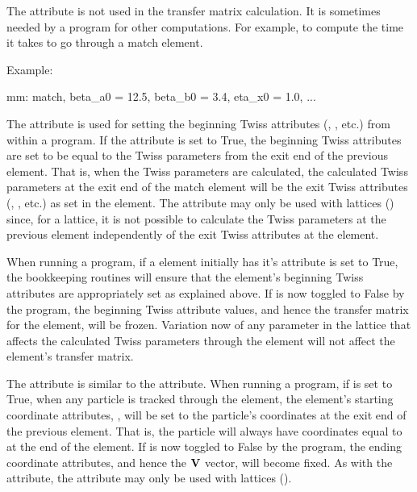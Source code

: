 {
The attribute  is not used in the transfer matrix
calculation. It is sometimes needed by a program for other
computations. For example, to compute the time it takes to go through
a match element.

Example:
\begin{example}
  mm: match, beta_a0 = 12.5, beta_b0 = 3.4, eta_x0 = 1.0, ...
\end{example}

  \begin{description} 
  \item[Match_end] \Newline
The  attribute is used for setting the beginning Twiss
attributes (, , etc.) from within a
program. If the  attribute is set to True, the beginning
Twiss attributes are set to be equal to the Twiss parameters from the
exit end of the previous element. That is, when the Twiss parameters
are calculated, the calculated Twiss parameters at the exit end of the
match element will be the exit Twiss attributes (,
, etc.) as set in the  element. The
 attribute may only be used with 
lattices () since, for a  lattice, it is
not possible to calculate the Twiss parameters at the previous element
independently of the exit Twiss attributes at the  element.

When running a program, if a  element initially has it's
 attribute is set to True, the \bmad bookkeeping
routines will ensure that the  element's beginning Twiss
attributes are appropriately set as explained above. If 
is now toggled to False by the program, the beginning Twiss attribute
values, and hence the transfer matrix for the  element, will
be frozen. Variation now of any parameter in the lattice that affects
the calculated Twiss parameters through the  element will
not affect the  element's transfer matrix.

  \item[match_end_orbit]
The  attribute is similar to the 
attribute.  When running a program, if  is set to
True, when any particle is tracked through the  element, the
 element's starting coordinate attributes, , will be set to the particle's coordinates at the exit
end of the previous element. That is, the particle will always have
coordinates equal to  at the end of
the  element.  If  is now toggled to
False by the program, the ending coordinate attributes, and hence the
${\bf V}$ vector, will become fixed. As with the 
attribute, the  attribute may only be used with
 lattices ().



\end{description}}
